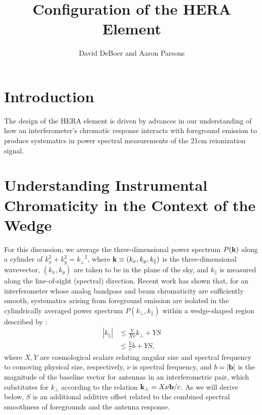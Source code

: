 \documentclass[11pt]{article}
\newcommand{\kvec}{{\bf k}}
\newcommand{\bvec}{{\bf b}}
\newcommand{\kpr}{{k_\perp}}
\newcommand{\kvpr}{{\kvec_\perp}}
\newcommand{\kpl}{{k_\parallel}}
\begin{document}
\title{Configuration of the HERA Element}
\author{David DeBoer and Aaron Parsons}
\maketitle

\section{Introduction}

The design of the HERA element is driven by advances in our understanding of how
an interferometer's chromatic response interacts with foreground emission to
produce systematics in power spectral measurements of the 21cm reionization signal.

\section{Understanding Instrumental Chromaticity in the Context of the Wedge}

For this discussion, we average the three-dimensional power spectrum $P(\kvec)$ along a cylinder
of $k_x^2+k_y^2=\kpr^2$, where $\kvec\equiv(k_x,k_y,\kpl)$ is the three-dimensional wavevector,
$(k_x,k_y)$ are taken to be in the plane of the sky, and $\kpl$ is measured along the line-of-sight (spectral)
direction.
Recent work has shown that, for an interferometer whose
analog bandpass and beam chromaticity are sufficiently smooth, systematics arising from foreground emission
are isolated in the cylindrically averaged power spectrum $P(\kpr,\kpl)$ within
a wedge-shaped region described by \citep{2012ApJ...756..165P,2013ApJ...768L..36P,2014ApJ...788..106P,2015arXiv150206016A}:
\begin{align}
|\kpl| &\le \frac{Y}{X\nu}\kpr + YS\nonumber\\
&\le \frac{Y}{c}b + YS,
\label{eq:wedge_bound}
\end{align}
where $X,Y$ are cosmological scalars relating angular size and spectral frequency to comoving 
physical size, respectively, $\nu$ is spectral frequency, and $b=|\bvec|$ is the magnitude of the baseline vector for
antennas in an interferometric pair, which substitutes for $\kpr$ according to the
relation $\kvpr=X\nu\bvec/c$. As we will derive below, $S$ is an additional additive offset related to
the combined spectral smoothness of foregrounds and the antenna response.
\end{document}
